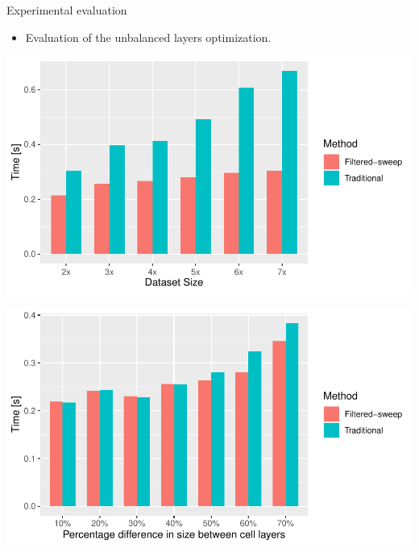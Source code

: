     \begin{frame}{Experimental evaluation}
        \begin{itemize}
            \item Evaluation of the unbalanced layers optimization.
        \end{itemize}
        \vspace{1cm}
        \begin{minipage}{0.49\textwidth}
            \centering
            \includegraphics[width=\textwidth]{figures/unbalance1}
        \end{minipage}\hfill %
        \begin{minipage}{0.49\textwidth}
            \centering
            \includegraphics[width=\textwidth]{figures/unbalance2}
        \end{minipage}
    \end{frame}


